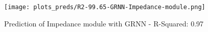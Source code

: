 
\begin{figure}[H]
    \centering
    \texttt{[image: plots\_preds/R2-99.65-GRNN-Impedance-module.png]}
    \caption{Prediction of Impedance module with GRNN - R-Squared: 0.97}
\end{figure}
